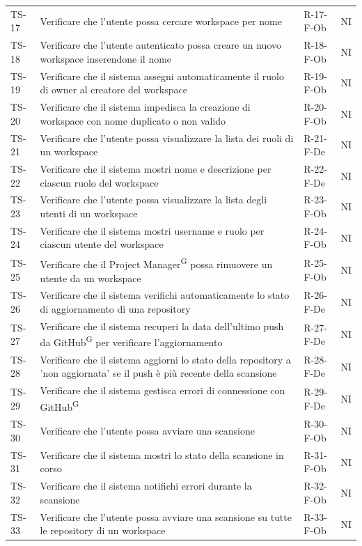 \documentclass[a4paper, 11pt]{article}
\begin{document}
\begin{longtable}{>{\centering\arraybackslash}m{1.2cm} >{\raggedright\arraybackslash}p{8.2cm} >{\centering\arraybackslash}m{2.5cm} >{\centering\arraybackslash}m{1.2cm}}
TS-17 & Verificare che l'utente possa cercare workspace per nome & R-17-F-Ob & NI \\
TS-18 & Verificare che l'utente autenticato possa creare un nuovo workspace inserendone il nome & R-18-F-Ob & NI \\
TS-19 & Verificare che il sistema assegni automaticamente il ruolo di owner al creatore del workspace & R-19-F-Ob & NI \\
TS-20 & Verificare che il sistema impedisca la creazione di workspace con nome duplicato o non valido & R-20-F-Ob & NI \\
TS-21 & Verificare che l'utente possa visualizzare la lista dei ruoli di un workspace & R-21-F-De & NI \\
TS-22 & Verificare che il sistema mostri nome e descrizione per ciascun ruolo del workspace & R-22-F-De & NI \\
TS-23 & Verificare che l'utente possa visualizzare la lista degli utenti di un workspace & R-23-F-Ob & NI \\
TS-24 & Verificare che il sistema mostri username e ruolo per ciascun utente del workspace & R-24-F-Ob & NI \\
TS-25 & Verificare che il Project Manager\textsuperscript{G} possa rimuovere un utente da un workspace & R-25-F-Ob & NI \\
TS-26 & Verificare che il sistema verifichi automaticamente lo stato di aggiornamento di una repository & R-26-F-De & NI \\
TS-27 & Verificare che il sistema recuperi la data dell'ultimo push da GitHub\textsuperscript{G} per verificare l'aggiornamento & R-27-F-De & NI \\
TS-28 & Verificare che il sistema aggiorni lo stato della repository a 'non aggiornata' se il push è più recente della scansione & R-28-F-De & NI \\
TS-29 & Verificare che il sistema gestisca errori di connessione con GitHub\textsuperscript{G} & R-29-F-De & NI \\
TS-30 & Verificare che l'utente possa avviare una scansione & R-30-F-Ob & NI \\
TS-31 & Verificare che il sistema mostri lo stato della scansione in corso & R-31-F-Ob & NI \\
TS-32 & Verificare che il sistema notifichi errori durante la scansione & R-32-F-Ob & NI \\
TS-33 & Verificare che l'utente possa avviare una scansione su tutte le repository di un workspace & R-33-F-Ob & NI \\

\end{longtable}
\end{document}
